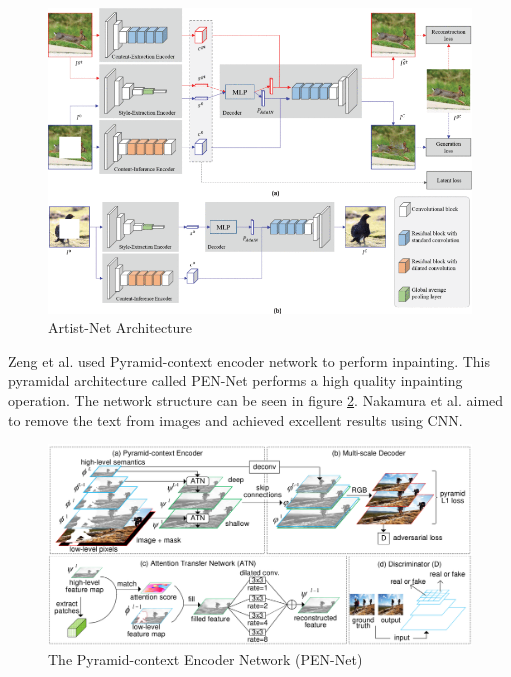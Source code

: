 \begin{figure}[h!]
    \centering
    \includegraphics[width=14cm]{figures/chapter4/artist.png}
    \vspace*{4mm}
    \caption{Artist-Net Architecture \cite{artistNet}}
    \label{fig:artistNet}
\end{figure}

Zeng et al. \cite{pyramid_network} used Pyramid-context encoder network to perform inpainting. This pyramidal architecture called PEN-Net performs a high quality inpainting operation. The network structure can be seen in figure \ref{fig:pennet}. Nakamura et al. \cite{nakamura} aimed to remove the text from images and achieved excellent results using CNN. 

\begin{figure}[h!]
    \centering
    \includegraphics[width=14cm]{figures/chapter4/pyramid.png}
    \vspace*{5mm}
    \caption{The Pyramid-context Encoder Network (PEN-Net) \cite{pyramid_network}}
    \label{fig:pennet}
\end{figure}

